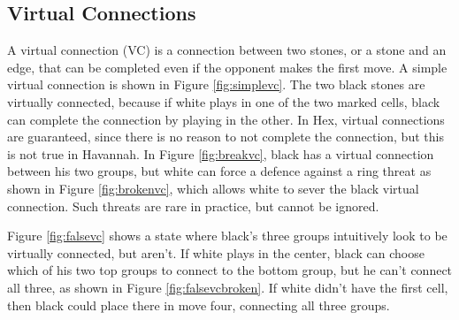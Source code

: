 \subsection{Virtual Connections}\label{sec:vc}

A virtual connection (VC) is a connection between two stones, or a stone and an edge, that can be completed even if the opponent makes the first move. A simple virtual connection is shown in Figure \ref{fig:simplevc}. The two black stones are virtually connected, because if white plays in one of the two marked cells, black can complete the connection by playing in the other. In Hex, virtual connections are guaranteed, since there is no reason to not complete the connection, but this is not true in Havannah. In Figure \ref{fig:breakvc}, black has a virtual connection between his two groups, but white can force a defence against a ring threat as shown in Figure \ref{fig:brokenvc}, which allows white to sever the black virtual connection. Such threats are rare in practice, but cannot be ignored.

Figure \ref{fig:falsevc} shows a state where black's three groups intuitively look to be virtually connected, but aren't. If white plays in the center, black can choose which of his two top groups to connect to the bottom group, but he can't connect all three, as shown in Figure \ref{fig:falsevcbroken}. If white didn't have the first cell, then black could place there in move four, connecting all three groups.


